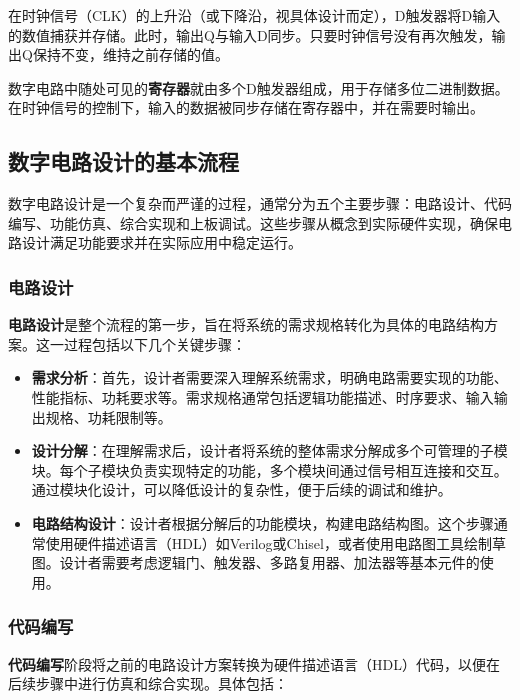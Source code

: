 在时钟信号（CLK）的上升沿（或下降沿，视具体设计而定），D触发器将D输入的数值捕获并存储。此时，输出Q与输入D同步。只要时钟信号没有再次触发，输出Q保持不变，维持之前存储的值。

数字电路中随处可见的\textbf{寄存器}就由多个D触发器组成，用于存储多位二进制数据。在时钟信号的控制下，输入的数据被同步存储在寄存器中，并在需要时输出。

\subsection{数字电路设计的基本流程}\label{sec:03-digital-logic-005}

数字电路设计是一个复杂而严谨的过程，通常分为五个主要步骤：电路设计、代码编写、功能仿真、综合实现和上板调试。这些步骤从概念到实际硬件实现，确保电路设计满足功能要求并在实际应用中稳定运行。

\subsubsection{电路设计}\label{sec:03-digital-logic-006}

\textbf{电路设计}是整个流程的第一步，旨在将系统的需求规格转化为具体的电路结构方案。这一过程包括以下几个关键步骤：

\begin{itemize}
\item
  \textbf{需求分析}：首先，设计者需要深入理解系统需求，明确电路需要实现的功能、性能指标、功耗要求等。需求规格通常包括逻辑功能描述、时序要求、输入输出规格、功耗限制等。
\item
  \textbf{设计分解}：在理解需求后，设计者将系统的整体需求分解成多个可管理的子模块。每个子模块负责实现特定的功能，多个模块间通过信号相互连接和交互。通过模块化设计，可以降低设计的复杂性，便于后续的调试和维护。
\item
  \textbf{电路结构设计}：设计者根据分解后的功能模块，构建电路结构图。这个步骤通常使用硬件描述语言（HDL）如Verilog或Chisel，或者使用电路图工具绘制草图。设计者需要考虑逻辑门、触发器、多路复用器、加法器等基本元件的使用。
\end{itemize}

\subsubsection{代码编写}\label{sec:03-digital-logic-007}

\textbf{代码编写}阶段将之前的电路设计方案转换为硬件描述语言（HDL）代码，以便在后续步骤中进行仿真和综合实现。具体包括：


